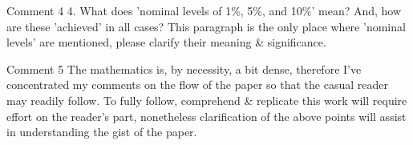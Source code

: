 \documentclass[11pt]{report}
\begin{document}
\begin{reviewbox}{Comment 4}
4. What does 'nominal levels of 1\%, 5\%, and 10\%' mean? And, how are these 'achieved' in all cases? This paragraph is the only place where 'nominal levels' are mentioned, please clarify their meaning \& significance.
\end{reviewbox}

\begin{reviewbox}{Comment 5}
The mathematics is, by necessity, a bit dense, therefore I've concentrated my comments on the flow of the paper so that the casual reader may readily follow. To fully follow, comprehend \& replicate this work will require effort on the reader's part, nonetheless clarification of the above points will assist in understanding the gist of the paper. 
\end{reviewbox}



\end{document}
